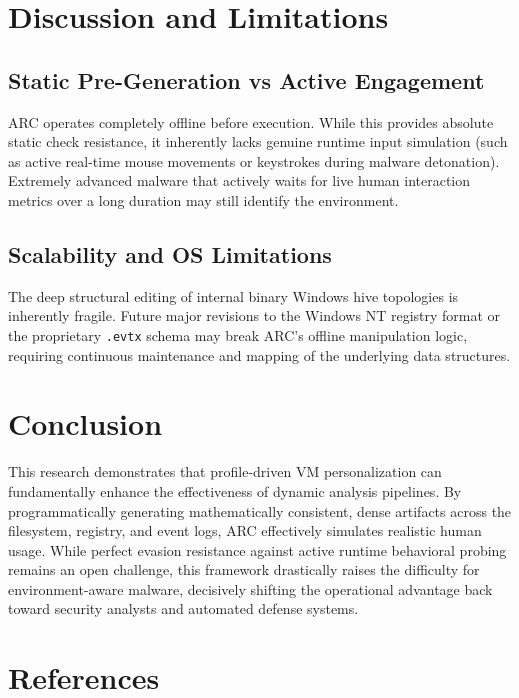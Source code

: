\documentclass{ieeeaccess}
\begin{document}
\section{Discussion and Limitations}

\subsection{Static Pre-Generation vs Active Engagement}
ARC operates completely offline before execution. While this provides absolute static check resistance, it inherently lacks genuine runtime input simulation (such as active real-time mouse movements or keystrokes during malware detonation). Extremely advanced malware that actively waits for live human interaction metrics over a long duration may still identify the environment.

\subsection{Scalability and OS Limitations}
The deep structural editing of internal binary Windows hive topologies is inherently fragile. Future major revisions to the Windows NT registry format or the proprietary \texttt{.evtx} schema may break ARC's offline manipulation logic, requiring continuous maintenance and mapping of the underlying data structures.

\section{Conclusion}

This research demonstrates that profile-driven VM personalization can fundamentally enhance the effectiveness of dynamic analysis pipelines. By programmatically generating mathematically consistent, dense artifacts across the filesystem, registry, and event logs, ARC effectively simulates realistic human usage. While perfect evasion resistance against active runtime behavioral probing remains an open challenge, this framework drastically raises the difficulty for environment-aware malware, decisively shifting the operational advantage back toward security analysts and automated defense systems.

\section*{References}
\end{document}
